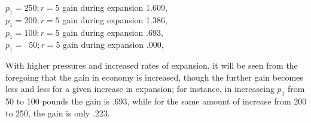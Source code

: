 \documentclass[11pt, a5paper]{book}
\begin{document}
\indent{}$p_1 = 250; r=5$  gain during expansion 1.609, \\
\indent{}$p_1 = 200; r=5$  gain during expansion 1.386, \\
\indent{}$p_1 = 100; r=5$  gain during expansion\; \;.693, \\
\indent{}$p_1 =\; \;50; r=5$  gain during expansion\; \;.000, \par

With higher pressures and increased rates of expansion, it will be
seen from the foregoing that the gain in economy is increased, though
the further gain becomes less and less for a given increase in
expansion; for instance, in increaseing $p_1$ from 50 to 100 pounds
the gain is .693, while for the same amount of increase from 200 to
250, the gain is only .223.\par
\end{document}
